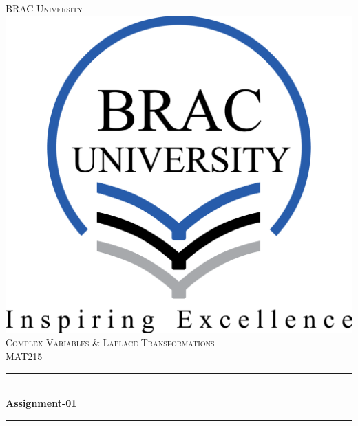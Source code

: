 \documentclass[12pt]{article}
\begin{document}
\begin{titlepage}

\newcommand{\HRule}{\rule{\linewidth}{0.5mm}} %

\center %
 

\textsc{\LARGE BRAC University}\\[1.5cm] %
\includegraphics[scale=.3]{bracu_logo.png}\\[1cm] %
\textsc{\Large Complex Variables \& Laplace Transformations}\\[0.5cm] %
\textsc{\large MAT215}\\[0.5cm] %


\HRule \\[0.4cm]
{ \huge \bfseries Assignment-01}\\[0.4cm] %
\HRule \\[1.5cm]
 

\end{titlepage}
\end{document}
